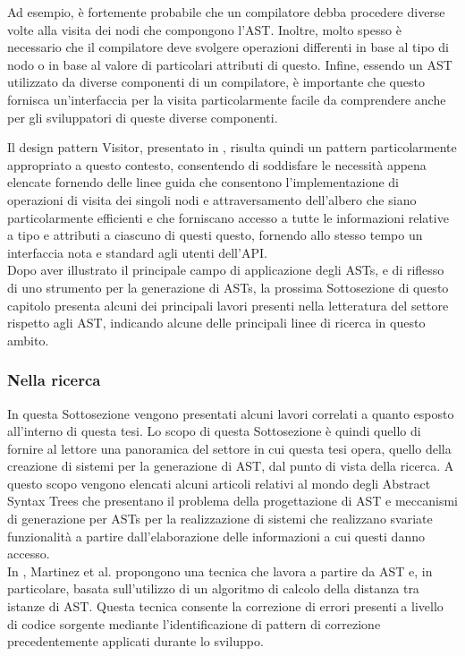 Ad esempio, è fortemente probabile che un compilatore debba procedere diverse
volte alla visita dei nodi che compongono l’AST. Inoltre, molto spesso è
necessario che il compilatore deve svolgere operazioni differenti in base al
tipo di nodo o in base al valore di particolari attributi di questo. Infine,
essendo un AST utilizzato da diverse componenti di un compilatore, è importante
che questo fornisca un’interfaccia per la visita particolarmente facile da
comprendere anche per gli sviluppatori di queste diverse componenti.

Il design pattern Visitor, presentato in \cite{gamma1995design}, risulta quindi
un pattern particolarmente appropriato a questo contesto, consentendo di
soddisfare le necessità appena elencate fornendo delle linee guida che
consentono l’implementazione di operazioni di visita dei singoli nodi e
attraversamento dell’albero che siano particolarmente efficienti e che
forniscano accesso a tutte le informazioni relative a tipo e attributi a
ciascuno di questi questo, fornendo allo stesso tempo un interfaccia nota e
standard agli utenti dell’API.\\

Dopo aver illustrato il principale campo di applicazione degli ASTs, e di
riflesso di uno strumento per la generazione di ASTs, la prossima Sottosezione
di questo capitolo presenta alcuni dei principali lavori presenti nella
letteratura del settore rispetto agli AST, indicando alcune delle principali
linee di ricerca in questo ambito.

\subsubsection{Nella ricerca}
\label{ast-research}

In questa Sottosezione vengono presentati alcuni lavori correlati a quanto
esposto all’interno di questa tesi. Lo scopo di questa Sottosezione è quindi
quello di fornire al lettore una panoramica del settore in cui questa tesi
opera, quello della creazione di sistemi per la generazione di AST, dal punto di
vista della ricerca. A questo scopo vengono elencati alcuni articoli relativi al
mondo degli Abstract Syntax Trees che presentano il problema della progettazione
di AST  e meccanismi di generazione per ASTs per la realizzazione di sistemi che
realizzano svariate funzionalità a partire dall’elaborazione delle informazioni
a cui questi danno accesso.\\

In \cite{martinez2014accurate}, Martinez et al. propongono una tecnica che
lavora a partire da AST e, in particolare, basata sull’utilizzo di un algoritmo
di calcolo della distanza tra istanze di AST. Questa tecnica consente la
correzione di errori presenti a livello di codice sorgente mediante
l’identificazione di pattern di correzione precedentemente applicati durante lo
sviluppo.

